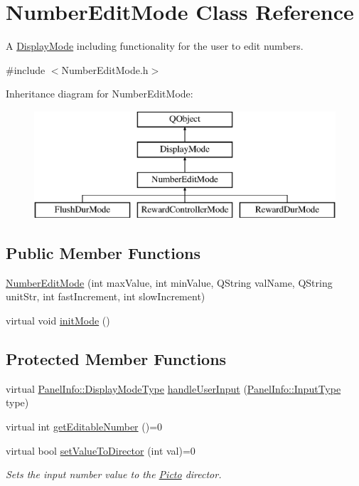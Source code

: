\hypertarget{class_number_edit_mode}{\section{Number\-Edit\-Mode Class Reference}
\label{class_number_edit_mode}
}


A \hyperlink{class_display_mode}{Display\-Mode} including functionality for the user to edit numbers.  




{\ttfamily \#include $<$Number\-Edit\-Mode.\-h$>$}

Inheritance diagram for Number\-Edit\-Mode\-:\begin{figure}[H]
\begin{center}
\leavevmode
\includegraphics[height=4.000000cm]{class_number_edit_mode}
\end{center}
\end{figure}
\subsection*{Public Member Functions}
\begin{DoxyCompactItemize}
\item 
\hyperlink{class_number_edit_mode_a637dbba420ed2d027df339f2bfb828aa}{Number\-Edit\-Mode} (int max\-Value, int min\-Value, Q\-String val\-Name, Q\-String unit\-Str, int fast\-Increment, int slow\-Increment)
\item 
virtual void \hyperlink{class_number_edit_mode_ad0ed3167dd2a15a53acbbb2ff89af18b}{init\-Mode} ()
\end{DoxyCompactItemize}
\subsection*{Protected Member Functions}
\begin{DoxyCompactItemize}
\item 
virtual \hyperlink{namespace_panel_info_adb8b98e092c15e831aa524d39701d565}{Panel\-Info\-::\-Display\-Mode\-Type} \hyperlink{class_number_edit_mode_a32ee550a022e1cd1da2f0981407516f9}{handle\-User\-Input} (\hyperlink{namespace_panel_info_aeeb3b627166cd15c3898f93a1a499c65}{Panel\-Info\-::\-Input\-Type} type)
\item 
virtual int \hyperlink{class_number_edit_mode_aef7d72cea8b4200456358d71ce2c8d34}{get\-Editable\-Number} ()=0
\item 
virtual bool \hyperlink{class_number_edit_mode_a0e8f5052a944af59f74a8cc97e8808b1}{set\-Value\-To\-Director} (int val)=0
\begin{DoxyCompactList}\small\item\em Sets the input number value to the \hyperlink{namespace_picto}{Picto} director. \end{DoxyCompactList}\end{DoxyCompactItemize}
